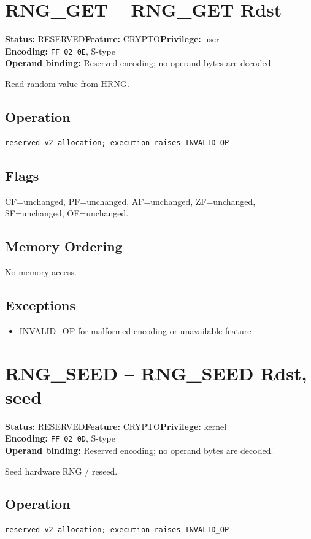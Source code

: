 \documentclass[10pt]{article}
\begin{document}
\section{RNG\_GET -- RNG\_GET Rdst}
\textbf{Status:} RESERVED\quad \textbf{Feature:} CRYPTO\quad \textbf{Privilege:} user\\
\textbf{Encoding:} \texttt{FF 02 0E}, S-type\\
\textbf{Operand binding:} Reserved encoding; no operand bytes are decoded.

Read random value from HRNG.

\subsection*{Operation}
\begin{lstlisting}
reserved v2 allocation; execution raises INVALID_OP
\end{lstlisting}
\subsection*{Flags}
CF=unchanged, PF=unchanged, AF=unchanged, ZF=unchanged, SF=unchanged, OF=unchanged.
\subsection*{Memory Ordering}
No memory access.
\subsection*{Exceptions}
\begin{itemize}
\item INVALID\_OP for malformed encoding or unavailable feature
\end{itemize}
\clearpage

\section{RNG\_SEED -- RNG\_SEED Rdst, seed}
\textbf{Status:} RESERVED\quad \textbf{Feature:} CRYPTO\quad \textbf{Privilege:} kernel\\
\textbf{Encoding:} \texttt{FF 02 0D}, S-type\\
\textbf{Operand binding:} Reserved encoding; no operand bytes are decoded.

Seed hardware RNG / reseed.

\subsection*{Operation}
\begin{lstlisting}
reserved v2 allocation; execution raises INVALID_OP
\end{lstlisting}
\end{document}
